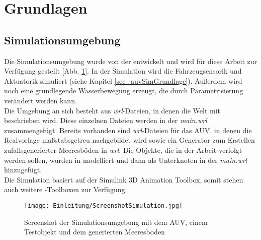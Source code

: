 \section{Grundlagen}
\subsection{Simulationsumgebung}
Die Simulationsumgebung wurde von der \atlas entwickelt und wird für diese Arbeit zur Verfügung gestellt [Abb. \ref{screenSim}].
In der Simulation wird die Fahrzeugsensorik und Aktuatorik simuliert (siehe Kapitel \ref{sec_auvSimGrundlage}). Außerdem wird noch eine grundlegende Wasserbewegung erzeugt, die durch Parametrisierung verändert werden kann.\\

Die Umgebung an sich besteht aus \textit{wrl}-Dateien, in denen die Welt mit \textit{\vrml} beschrieben wird. Diese einzelnen Dateien werden in der \textit{main.wrl} zusammengefügt. Bereits vorhanden sind \textit{wrl}-Dateien für das AUV, in denen die Realvorlage maßstabsgetreu nachgebildet wird sowie ein Generator zum Erstellen zufallsgenerierter Meeresböden in \textit{wrl}. Die Objekte, die in der Arbeit verfolgt werden sollen, wurden in \textit{\vrml} modelliert und dann als Unterknoten in der \textit{main.wrl} hinzugefügt.\\
Die Simulation basiert auf der \matlab Simulink 3D Animation Toolbox, somit stehen auch weitere \matlab -Toolboxen zur Verfügung. 
\begin{figure}[H]
\texttt{[image: Einleitung/ScreenshotSimulation.jpg]}
\caption[Screenshot der Simulationsumgebung]{Screenshot der Simulationsumgebung mit dem AUV, einem Testobjekt und dem generierten Meeresboden}
\label{screenSim}
\end{figure}
